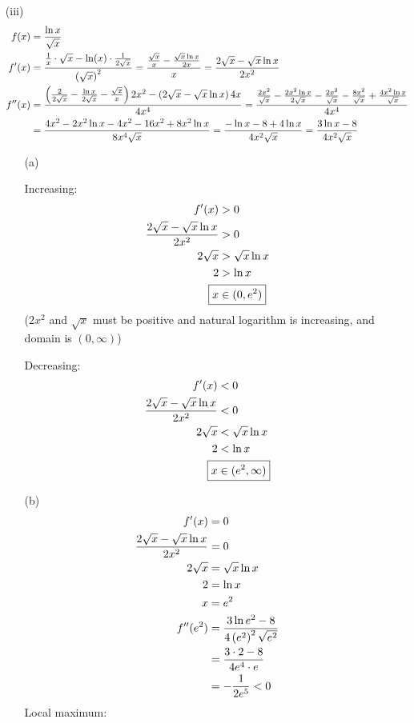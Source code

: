 \documentclass{article}
\newcommand*{\paren}[1]{\ensuremath\left(#1\right)}
\begin{document}
\begin{itemize}
	\item[(iii)]
	\begin{align*}
		f(x)&=\frac{\ln x}{\sqrt{x}} \\
		f'(x)&=\frac{\frac{1}{x}\cdot\sqrt{x}-\ln(x)\cdot\frac{1}{2\sqrt{x}}}{\paren{\sqrt{x}}^2}=\frac{\frac{\sqrt{x}}{x}-\frac{\sqrt{x}\ln x}{2x}}{x}=\frac{2\sqrt{x}-\sqrt{x}\ln x}{2x^2} \\
		f''(x)&=\frac{\paren{\frac{2}{2\sqrt{x}}-\frac{\ln x}{2\sqrt{x}}-\frac{\sqrt{x}}{x}}2x^2-\paren{2\sqrt{x}-\sqrt{x}\ln x}4x}{4x^4}
		=\frac{\frac{2x^2}{\sqrt{x}}-\frac{2x^2\ln x}{2\sqrt{x}}-\frac{2x^2}{\sqrt{x}}-\frac{8x^2}{\sqrt{x}}+\frac{4x^2\ln x}{\sqrt{x}}}{4x^4} \\
		&=\frac{4x^2-2x^2\ln x-4x^2-16x^2+8x^2\ln x}{8x^4\sqrt{x}}
		=\frac{-\ln x-8+4\ln x}{4x^2\sqrt{x}}=\frac{3\ln x-8}{4x^2\sqrt{x}}
	\end{align*}
	\begin{itemize}
		\item[(a)]
		\begin{multicols}{2}
			Increasing:
			\begin{align*}
				f'(x)&>0 \\
				\frac{2\sqrt{x}-\sqrt{x}\ln x}{2x^2}&>0 \\
				2\sqrt{x}&>\sqrt{x}\ln x \\
				2&>\ln x \\
				\Aboxed{x&\in(0,e^2)}
			\end{align*}
			($2x^2$ and $\sqrt{x}$ must be positive and natural logarithm is increasing, and domain is $(0,\infty)$)

			\columnbreak

			Decreasing:
			\begin{align*}
				f'(x)&<0 \\
				\frac{2\sqrt{x}-\sqrt{x}\ln x}{2x^2}&<0 \\
				2\sqrt{x}&<\sqrt{x}\ln x \\
				2&<\ln x \\
				\Aboxed{x&\in(e^2,\infty)}
			\end{align*}
		\end{multicols}
	
		\pagebreak
		\item[(b)]
		\begin{align*}
			f'(x)&=0 \\
			\frac{2\sqrt{x}-\sqrt{x}\ln x}{2x^2}&=0 \\
			2\sqrt{x}&=\sqrt{x}\ln x \\
			2&=\ln x \\
			x&=e^2 \\
			f''(e^2)&=\frac{3\ln e^2-8}{4\paren{e^2}^2\sqrt{e^2}} \\
			&=\frac{3\cdot2-8}{4e^4\cdot e} \\
			&=-\frac{1}{2e^5}<0
		\end{align*}
		Local maximum: 
	

\end{itemize}
\end{itemize}
\end{document}
